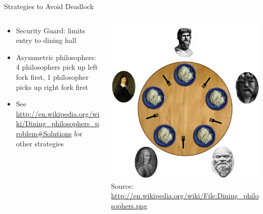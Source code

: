 \begin{frame}{Strategies to Avoid Deadlock}
  \begin{columns}[c]
    \begin{column}{0.45\textwidth}
  \begin{itemize}
  \item Security Guard: limits entry to dining hall
  \item Asymmetric philosophers: 4 philosophers pick up left fork
    first, 1 philosopher picks up right fork first
  \item See \url{http://en.wikipedia.org/wiki/Dining_philosophers_problem\#Solutions} 
    for other strategies
  \end{itemize}
    \end{column}
    \begin{column}{0.55\textwidth}
      \begin{center}
        \includegraphics[width=\textwidth]{figures/dining-philosophers} \\
        \tiny{Source: \url{http://en.wikipedia.org/wiki/File:Dining_philosophers.png}}
      \end{center}
    \end{column}
  \end{columns}
\end{frame}

